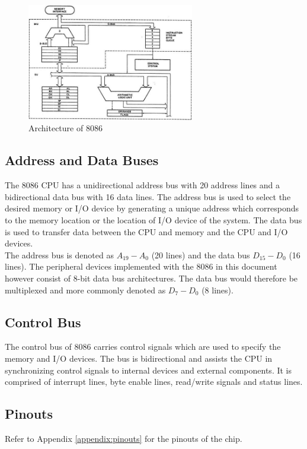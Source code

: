         \begin{figure}[h]
            \begin{center}
                \includegraphics[width=0.65\textwidth]{figures/02_8086_architecture.jpg}
                \caption{Architecture of 8086} \label{fig:8086_architecture}
            \end{center}
        \end{figure}

    \subsection{Address and Data Buses}
    The 8086 CPU has a unidirectional address bus with 20 address lines and a bidirectional data bus with 16 data lines. \cite{buses} The address bus is used to select the desired memory or I/O device by generating a unique address which corresponds to the memory location or the location of I/O device of the system. The data bus is used to transfer data between the CPU and memory and the CPU and I/O devices.\\

    The address bus is denoted as $A_{19}-A_{0}$ (20 lines) and the data bus $D_{15}-D_{0}$ (16 lines). The peripheral devices implemented with the 8086 in this document however consist of 8-bit data bus architectures. The data bus would therefore be multiplexed and more commonly denoted as $D_{7}-D_{0}$ (8 lines).

    \subsection{Control Bus}
    The control bus of 8086 carries control signals which are used to specify the memory and I/O devices. \cite{buses} The bus is bidirectional and assists the CPU in synchronizing control signals to internal devices and external components. It is comprised of interrupt lines, byte enable lines, read/write signals and status lines.

    \subsection{Pinouts}
    Refer to Appendix \ref{appendix:pinouts} for the pinouts of the chip.
